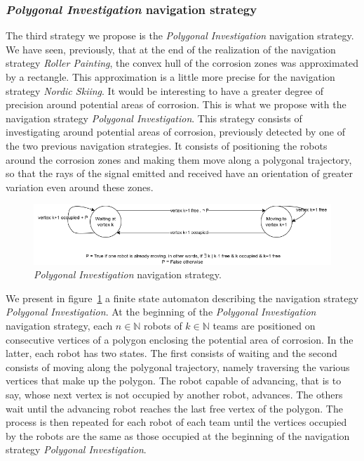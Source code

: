 \documentclass[english,RandD]{rapportPFE}  %
\begin{document}
			\subsubsection*{\textit{Polygonal Investigation} navigation strategy}
				The third strategy we propose is the \textit{Polygonal Investigation} navigation strategy.
				We have seen, previously, that at the end of the realization of the navigation strategy \textit{Roller Painting}, the convex hull of the corrosion zones was approximated by a rectangle.
				This approximation is a little more precise for the navigation strategy \textit{Nordic Skiing}.
				It would be interesting to have a greater degree of precision around potential areas of corrosion.
				This is what we propose with the navigation strategy \textit{Polygonal Investigation}.
				This strategy consists of investigating around potential areas of corrosion, previously detected by one of the two previous navigation strategies.
				It consists of positioning the robots around the corrosion zones and making them move along a polygonal trajectory, so that the rays of the signal emitted and received have an orientation of greater variation even around these zones.

				\begin{figure}[h!]
					\centering
					\includegraphics[scale=0.6]{graphics/automat_poly.png}
					\caption{\textit{Polygonal Investigation} navigation strategy.}
					\label{fig:automat}
				\end{figure}

				We present in figure~\ref{fig:automat} a finite state automaton describing the navigation strategy \textit{Polygonal Investigation}.
				At the beginning of the \textit{Polygonal Investigation} navigation strategy, each $n \in \mathbb{N}$ robots of $k \in \mathbb{N}$ teams are positioned on consecutive vertices of a polygon enclosing the potential area of corrosion.
				In the latter, each robot has two states.
				The first consists of waiting and the second consists of moving along the polygonal trajectory, namely traversing the various vertices that make up the polygon.
				The robot capable of advancing, that is to say, whose next vertex is not occupied by another robot, advances.
				The others wait until the advancing robot reaches the last free vertex of the polygon.
				The process is then repeated for each robot of each team until the vertices occupied by the robots are the same as those occupied at the beginning of the navigation strategy \textit{Polygonal Investigation}.
\end{document}
